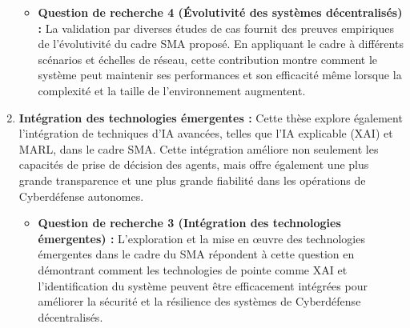 \begin{enumerate}
          \begin{itemize}
              \item \textbf{Question de recherche 4 (Évolutivité des systèmes décentralisés) :} La validation par diverses études de cas fournit des preuves empiriques de l'évolutivité du cadre SMA proposé. En appliquant le cadre à différents scénarios et échelles de réseau, cette contribution montre comment le système peut maintenir ses performances et son efficacité même lorsque la complexité et la taille de l'environnement augmentent.
          \end{itemize}

    \item \textbf{Intégration des technologies émergentes :} Cette thèse explore également l'intégration de techniques d'IA avancées, telles que l'IA explicable (XAI) et MARL, dans le cadre SMA. Cette intégration améliore non seulement les capacités de prise de décision des agents, mais offre également une plus grande transparence et une plus grande fiabilité dans les opérations de Cyberdéfense autonomes.

          \begin{itemize}
              \item \textbf{Question de recherche 3 (Intégration des technologies émergentes) :} L'exploration et la mise en œuvre des technologies émergentes dans le cadre du SMA répondent à cette question en démontrant comment les technologies de pointe comme XAI et l'identification du système peuvent être efficacement intégrées pour améliorer la sécurité et la résilience des systèmes de Cyberdéfense décentralisés.
          \end{itemize}

\end{enumerate}





